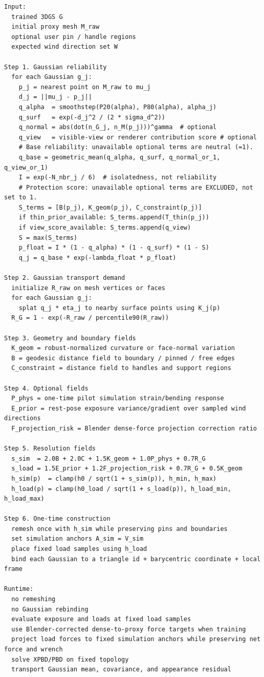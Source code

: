 \documentclass[11pt,a4paper]{article}
\begin{document}
\begin{lstlisting}
Input:
  trained 3DGS G
  initial proxy mesh M_raw
  optional user pin / handle regions
  expected wind direction set W

Step 1. Gaussian reliability
  for each Gaussian g_j:
    p_j = nearest point on M_raw to mu_j
    d_j = ||mu_j - p_j||
    q_alpha  = smoothstep(P20(alpha), P80(alpha), alpha_j)
    q_surf   = exp(-d_j^2 / (2 * sigma_d^2))
    q_normal = abs(dot(n_G_j, n_M(p_j)))^gamma  # optional
    q_view   = visible-view or renderer contribution score # optional
    # Base reliability: unavailable optional terms are neutral (=1).
    q_base = geometric_mean(q_alpha, q_surf, q_normal_or_1, q_view_or_1)
    I = exp(-N_nbr_j / 6)  # isolatedness, not reliability
    # Protection score: unavailable optional terms are EXCLUDED, not set to 1.
    S_terms = [B(p_j), K_geom(p_j), C_constraint(p_j)]
    if thin_prior_available: S_terms.append(T_thin(p_j))
    if view_score_available: S_terms.append(q_view)
    S = max(S_terms)
    p_float = I * (1 - q_alpha) * (1 - q_surf) * (1 - S)
    q_j = q_base * exp(-lambda_float * p_float)

Step 2. Gaussian transport demand
  initialize R_raw on mesh vertices or faces
  for each Gaussian g_j:
    splat q_j * eta_j to nearby surface points using K_j(p)
  R_G = 1 - exp(-R_raw / percentile90(R_raw))

Step 3. Geometry and boundary fields
  K_geom = robust-normalized curvature or face-normal variation
  B = geodesic distance field to boundary / pinned / free edges
  C_constraint = distance field to handles and support regions

Step 4. Optional fields
  P_phys = one-time pilot simulation strain/bending response
  E_prior = rest-pose exposure variance/gradient over sampled wind directions
  F_projection_risk = Blender dense-force projection correction ratio

Step 5. Resolution fields
  s_sim  = 2.0B + 2.0C + 1.5K_geom + 1.0P_phys + 0.7R_G
  s_load = 1.5E_prior + 1.2F_projection_risk + 0.7R_G + 0.5K_geom
  h_sim(p)  = clamp(h0 / sqrt(1 + s_sim(p)), h_min, h_max)
  h_load(p) = clamp(h0_load / sqrt(1 + s_load(p)), h_load_min, h_load_max)

Step 6. One-time construction
  remesh once with h_sim while preserving pins and boundaries
  set simulation anchors A_sim = V_sim
  place fixed load samples using h_load
  bind each Gaussian to a triangle id + barycentric coordinate + local frame

Runtime:
  no remeshing
  no Gaussian rebinding
  evaluate exposure and loads at fixed load samples
  use Blender-corrected dense-to-proxy force targets when training
  project load forces to fixed simulation anchors while preserving net force and wrench
  solve XPBD/PBD on fixed topology
  transport Gaussian mean, covariance, and appearance residual
\end{lstlisting}
\end{document}
